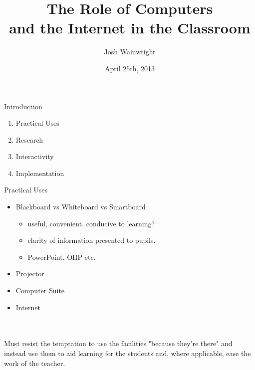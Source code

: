 \documentclass{beamer}
\title[Role of IT in the Classroom]{The Role of Computers \\and the Internet in the Classroom}
\author{Josh Wainwright}
\institute{King Edward VI Five Ways School\\ Bartley Green}
\date{April 25th, 2013}
\begin{document}
\begin{frame}
\titlepage
\end{frame}


\begin{frame}{Introduction}
    \begin{enumerate}
        \item Practical Uses
        \item Research
        \item Interactivity
        \item Implementation
    \end{enumerate}
\end{frame}

\begin{frame}{Practical Uses}
    \begin{itemize}
        \item Blackboard vs Whiteboard vs Smartboard
        \begin{itemize}
            \item useful, convenient, conducive to learning?
            \item clarity of information presented to pupils.
            \item PowerPoint, OHP etc.
        \end{itemize}
        \item Projector
        \item Computer Suite
        \item Internet
        \end{itemize}
    \\~\\
    \pause
    Must resist the temptation to use the facilities "because they're there" and instead use them to aid learning for the students and, where applicable, ease the work of the teacher.
\end{frame}
\end{document}
